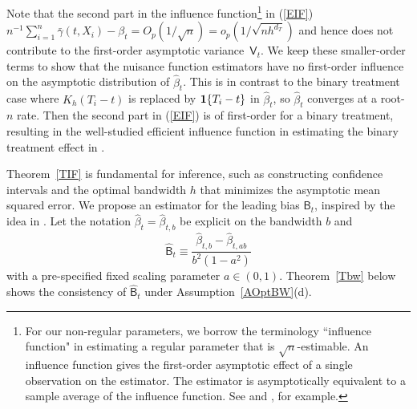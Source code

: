 \documentclass[lettersize, 12pt]{article}
\begin{document}
 
Note that the second part in the influence function\footnote{
For our non-regular parameters, we borrow the terminology  ``influence function" in estimating a regular parameter that is $\sqrt{n}$-estimable. 
An influence function gives the first-order asymptotic effect of a single observation on the estimator.
The estimator is asymptotically equivalent to a sample average of the influence function.
See \cite{Hampel} and \cite{IchimuraNewey22QE}, for example.
} in (\ref{EIF}) $n^{-1}\sum_{i=1}^n \bar\gamma(t,X_i) - \beta_t = O_p(1/\sqrt{n}) = o_p(1/\sqrt{nh^{d_T}})$ and hence does not contribute to the first-order asymptotic variance~$\mathsf{V}_t$.
We keep these smaller-order terms to show that the nuisance function estimators have no first-order influence on the asymptotic distribution of $\hat \beta_t$.
This is in contrast to the binary treatment case where $K_h(T_i-t)$ is replaced by ${\bf 1}\{T_i - t\}$ in $\hat \beta_t$, 
so $\hat \beta_t$ converges at a root-$n$ rate.
Then the second part in (\ref{EIF}) is of first-order for a binary treatment, resulting in the well-studied efficient influence function in estimating the binary treatment effect in \cite{Hahn98ETA}.

Theorem~\ref{TIF} is fundamental for inference, such as constructing confidence intervals and the optimal bandwidth $h$ that minimizes the asymptotic mean squared error.
We propose an estimator for the leading bias  $\mathsf{B}_t$, inspired by the idea in \cite{PS96}.
Let the notation $\hat\beta_t = \hat\beta_{t,b}$ be explicit on the bandwidth $b$ and
\[
\hat{\mathsf{B}}_t \equiv \frac{\hat\beta_{t,b} - \hat\beta_{t,ab}}{b^2 (1-a^2)}
\] 
with a pre-specified fixed scaling parameter $a \in (0, 1)$.
Theorem~\ref{Tbw} below shows the consistency of $\hat{\mathsf{B}}_t$ under Assumption~\ref{AOptBW}(d).
\end{document}
